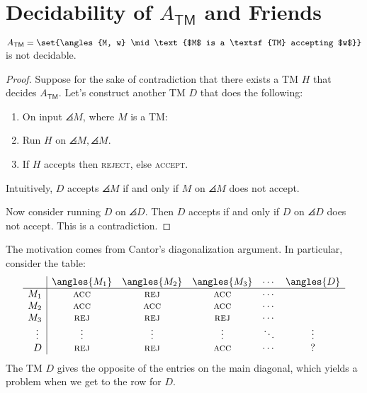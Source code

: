 \documentclass{standalone}
\begin{document}
\section{Decidability of \texorpdfstring{\(A_{\textsf{TM}}\)}{A\_TM} and Friends}
\begin{theorem}
  \(A_{\textsf{TM}} = \set{\angles{M, w} \mid \text{$M$ is a \textsf{TM} accepting $w$}}\) is not decidable.
\end{theorem}
\begin{proof}
  Suppose for the sake of contradiction that there exists a \textsf{TM} \(H\) that decides \(A_{\textsf{TM}}\). Let's construct another \textsf{TM} \(D\) that does the following:
  \begin{enumerate}[start=0]
    \item On input \(\angles{M}\), where \(M\) is a \textsf{TM}:
    \item Run \(H\) on \(\angles{M, \angles{M}}\).
    \item If \(H\) accepts then \textsc{reject}, else \textsc{accept}.
  \end{enumerate}
  
  Intuitively, \(D\) accepts \(\angles{M}\) if and only if \(M\) on \(\angles M\) does not accept.

  Now consider running \(D\) on \(\angles{D}\). Then \(D\) accepts if and only if \(D\) on \(\angles{D}\) does not accept. This is a contradiction.
\end{proof}

The motivation comes from Cantor's diagonalization argument. In particular, consider the table:
\[
  \begin{array}{r | c c c c c} %
        & \angles{M_1} & \angles{M_2} & \angles{M_3} & \cdots & \angles{D} \\ \hline %
    M_1 & \textsc{acc} & \textsc{rej} & \textsc{acc} & \cdots & \\
    M_2 & \textsc{acc} & \textsc{acc} & \textsc{acc} & \cdots & \\
    M_3 & \textsc{rej} & \textsc{rej} & \textsc{rej} & \cdots & \\
    \vdots\,\, & \vdots & \vdots & \vdots & \ddots & \vdots \\
    D & \textsc{rej} & \textsc{rej} & \textsc{acc} & \cdots & ? \\
  \end{array}
\]
The \textsf{TM} \(D\) gives the opposite of the entries on the main diagonal, which yields a problem when we get to the row for \(D\).
\end{document}
